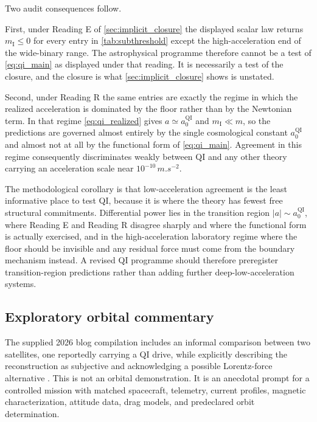 \documentclass[11pt]{article}
\newcommand{\QI}{\mathrm{QI}}
\begin{document}
Two audit consequences follow.

First, under Reading E of \cref{sec:implicit_closure} the displayed scalar law returns \(m_{\mathrm I}\le0\) for every entry in \cref{tab:subthreshold} except the high-acceleration end of the wide-binary range. The astrophysical programme therefore cannot be a test of \cref{eq:qi_main} as displayed under that reading. It is necessarily a test of the closure, and the closure is what \cref{sec:implicit_closure} shows is unstated.

Second, under Reading R the same entries are exactly the regime in which the realized acceleration is dominated by the floor rather than by the Newtonian term. In that regime \cref{eq:qi_realized} gives \(a\simeq a_{0}^{\QI}\) and \(m_{\mathrm I}\ll m\), so the predictions are governed almost entirely by the single cosmological constant \(a_{0}^{\QI}\) and almost not at all by the functional form of \cref{eq:qi_main}. Agreement in this regime consequently discriminates weakly between QI and any other theory carrying an acceleration scale near \(10^{-10}\,\si{m.s^{-2}}\).

The methodological corollary is that low-acceleration agreement is the least informative place to test QI, because it is where the theory has fewest free structural commitments. Differential power lies in the transition region \(|a|\sim a_{0}^{\QI}\), where Reading E and Reading R disagree sharply and where the functional form is actually exercised, and in the high-acceleration laboratory regime where the floor should be invisible and any residual force must come from the boundary mechanism instead. A revised QI programme should therefore preregister transition-region predictions rather than adding further deep-low-acceleration systems.

\subsection{Exploratory orbital commentary}

The supplied 2026 blog compilation includes an informal comparison between two satellites, one reportedly carrying a QI drive, while explicitly describing the reconstruction as subjective and acknowledging a possible Lorentz-force alternative \cite{McCullochBlog2026}. This is not an orbital demonstration. It is an anecdotal prompt for a controlled mission with matched spacecraft, telemetry, current profiles, magnetic characterization, attitude data, drag models, and predeclared orbit determination.
\end{document}
